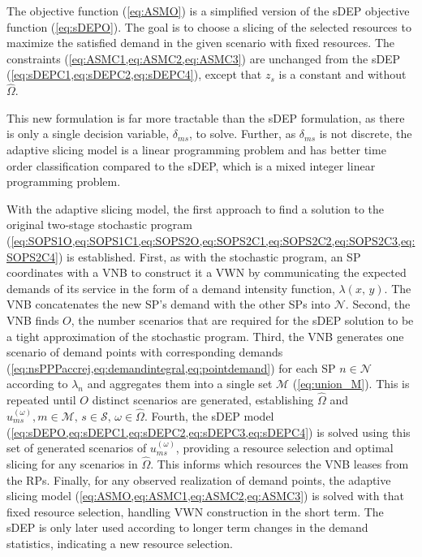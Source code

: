 \documentclass[12pt,dvipsnames]{report}
\begin{document}
The objective function (\cref{eq:ASMO}) is a simplified version of the sDEP objective function (\cref{eq:sDEPO}).  The goal is to choose a slicing of the selected resources to maximize the satisfied demand in the given scenario with fixed resources.  The constraints (\cref{eq:ASMC1,eq:ASMC2,eq:ASMC3}) are unchanged from the sDEP (\cref{eq:sDEPC1,eq:sDEPC2,eq:sDEPC4}), except that $z_s$ is a constant and without $\hat{\Omega}$.

This new formulation is far more tractable than the sDEP formulation, as there is only a single decision variable, $\delta_{ms}$, to solve.  Further, as $\delta_{ms}$ is not discrete, the adaptive slicing model is a linear programming problem and has better time order classification compared to the sDEP, which is a mixed integer linear programming problem.

With the adaptive slicing model, the first approach to find a solution to the original two-stage stochastic program (\cref{eq:SOPS1O,eq:SOPS1C1,eq:SOPS2O,eq:SOPS2C1,eq:SOPS2C2,eq:SOPS2C3,eq:SOPS2C4}) is established.  First, as with the stochastic program, an SP coordinates with a VNB to construct it a VWN by communicating the expected demands of its service in the form of a demand intensity function, $\lambda \left( x,\, y \right)$.  The VNB concatenates the new SP's demand with the other SPs into $\mathcal{N}$.  Second, the VNB finds $O$, the number scenarios that are required for the sDEP solution to be a tight approximation of the stochastic program.  Third, the VNB generates one scenario of demand points with corresponding demands (\cref{eq:nsPPPaccrej,eq:demandintegral,eq:pointdemand}) for each SP $n \in \mathcal{N}$ according to $\lambda_n$ and aggregates them into a single set $\mathcal{M}$ (\cref{eq:union_M}).  This is repeated until $O$ distinct scenarios are generated, establishing $\hat{\Omega}$ and $u_{ms}^{\left( \omega \right)}, m \in \mathcal{M},\, s \in \mathcal{S},\, \omega \in \hat{\Omega}$.  Fourth, the sDEP model (\cref{eq:sDEPO,eq:sDEPC1,eq:sDEPC2,eq:sDEPC3,eq:sDEPC4}) is solved using this set of generated scenarios of $u_{ms}^{\left( \omega \right)}$, providing a resource selection and optimal slicing for any scenarios in $\hat{\Omega}$.  This informs which resources the VNB leases from the RPs.  Finally, for any observed realization of demand points, the adaptive slicing model (\cref{eq:ASMO,eq:ASMC1,eq:ASMC2,eq:ASMC3}) is solved with that fixed resource selection, handling VWN construction in the short term.  The sDEP is only later used according to longer term changes in the demand statistics, indicating a new resource selection.
\end{document}
